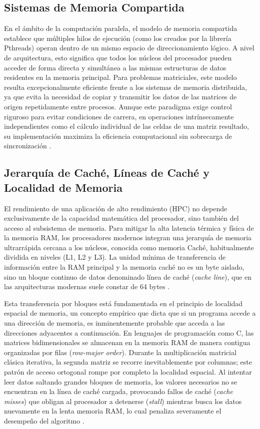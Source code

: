\subsection{Sistemas de Memoria Compartida}
En el ámbito de la computación paralela, el modelo de memoria compartida establece que múltiples hilos de ejecución (como los creados por la librería Pthreads) operan dentro de un mismo espacio de direccionamiento lógico. A nivel de arquitectura, esto significa que todos los núcleos del procesador pueden acceder de forma directa y simultánea a las mismas estructuras de datos residentes en la memoria principal. Para problemas matriciales, este modelo resulta excepcionalmente eficiente frente a los sistemas de memoria distribuida, ya que evita la necesidad de copiar y transmitir los datos de las matrices de origen repetidamente entre procesos. Aunque este paradigma exige control riguroso para evitar condiciones de carrera, en operaciones intrínsecamente independientes como el cálculo individual de las celdas de una matriz resultado, su implementación maximiza la eficiencia computacional sin sobrecarga de sincronización \parencite{Silberschatz2018Operating}.

\subsection{Jerarquía de Caché, Líneas de Caché y Localidad de Memoria}
El rendimiento de una aplicación de alto rendimiento (HPC) no depende exclusivamente de la capacidad matemática del procesador, sino también del acceso al subsistema de memoria. Para mitigar la alta latencia térmica y física de la memoria RAM, los procesadores modernos integran una jerarquía de memoria ultrarrápida cercana a los núcleos, conocida como memoria Caché, habitualmente dividida en niveles (L1, L2 y L3). La unidad mínima de transferencia de información entre la RAM principal y la memoria caché no es un byte aislado, sino un bloque continuo de datos denominado línea de caché (\textit{cache line}), que en las arquitecturas modernas suele constar de 64 bytes \parencite{Drepper2007Memory}.

Esta transferencia por bloques está fundamentada en el principio de localidad espacial de memoria, un concepto empírico que dicta que si un programa accede a una dirección de memoria, es inminentemente probable que acceda a las direcciones adyacentes a continuación. En lenguajes de programación como C, las matrices bidimensionales se almacenan en la memoria RAM de manera contigua organizadas por filas (\textit{row-major order}). Durante la multiplicación matricial clásica iterativa, la segunda matriz se recorre inevitablemente por columnas; este patrón de acceso ortogonal rompe por completo la localidad espacial. Al intentar leer datos saltando grandes bloques de memoria, los valores necesarios no se encuentran en la línea de caché cargada, provocando fallos de caché (\textit{cache misses}) que obligan al procesador a detenerse (\textit{stall}) mientras busca los datos nuevamente en la lenta memoria RAM, lo cual penaliza severamente el desempeño del algoritmo \parencite{Patterson2017Computer}.

